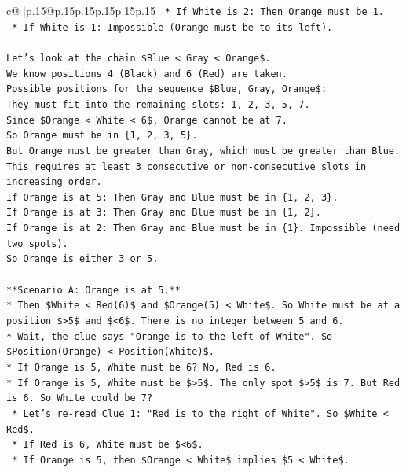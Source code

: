 \documentclass{article}
\begin{document}
{\begin{supertabular}{c@{$\;$}|p{.15\linewidth}@{}p{.15\linewidth}p{.15\linewidth}p{.15\linewidth}p{.15\linewidth}p{.15\linewidth}}
{{{\texttt{    *   If White is 2: Then Orange must be 1.} \\
\texttt{    *   If White is 1: Impossible (Orange must be to its left).} \\
\\ 
\texttt{Let's look at the chain \$Blue < Gray < Orange\$.} \\
\texttt{We know positions 4 (Black) and 6 (Red) are taken.} \\
\texttt{Possible positions for the sequence \$Blue, Gray, Orange\$:} \\
\texttt{They must fit into the remaining slots: 1, 2, 3, 5, 7.} \\
\texttt{Since \$Orange < White < 6\$, Orange cannot be at 7.} \\
\texttt{So Orange must be in \{1, 2, 3, 5\}.} \\
\texttt{But Orange must be greater than Gray, which must be greater than Blue. This requires at least 3 consecutive or non{-}consecutive slots in increasing order.} \\
\texttt{If Orange is at 5: Then Gray and Blue must be in \{1, 2, 3\}.} \\
\texttt{If Orange is at 3: Then Gray and Blue must be in \{1, 2\}.} \\
\texttt{If Orange is at 2: Then Gray and Blue must be in \{1\}. Impossible (need two spots).} \\
\texttt{So Orange is either 3 or 5.} \\
\\ 
\texttt{**Scenario A: Orange is at 5.**} \\
\texttt{*   Then \$White < Red(6)\$ and \$Orange(5) < White\$. So White must be at a position \$>5\$ and \$<6\$. There is no integer between 5 and 6.} \\
\texttt{*   Wait, the clue says "Orange is to the left of White". So \$Position(Orange) < Position(White)\$.} \\
\texttt{*   If Orange is 5, White must be 6? No, Red is 6.} \\
\texttt{*   If Orange is 5, White must be \$>5\$. The only spot \$>5\$ is 7. But Red is 6. So White could be 7?} \\
\texttt{    *   Let's re{-}read Clue 1: "Red is to the right of White". So \$White < Red\$.} \\
\texttt{    *   If Red is 6, White must be \$<6\$.} \\
\texttt{    *   If Orange is 5, then \$Orange < White\$ implies \$5 < White\$.} \\
}}}
\end{supertabular}}
\end{document}
